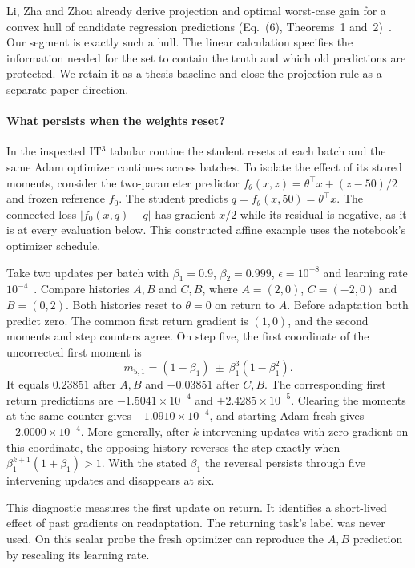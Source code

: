 \documentclass[11pt,a4paper]{article}
\begin{document}
Li, Zha and Zhou already derive projection and optimal worst-case gain for
a convex hull of candidate regression predictions (Eq.~(6), Theorems~1
and~2)~\cite{safer}. Our segment is exactly such a hull. The linear
calculation specifies the information needed for the set to contain the
truth and which old predictions are protected. We retain it as a thesis
baseline and close the projection rule as a separate paper direction.

\paragraph{What persists when the weights reset?}
In the inspected IT$^3$ tabular routine the student resets at each batch
and the same Adam optimizer continues across batches. To isolate the
effect of its stored moments, consider the two-parameter predictor
$f_\theta(x,z)=\theta^\top x+(z-50)/2$ and frozen reference $f_0$.
The student predicts $q=f_\theta(x,50)=\theta^\top x$. The connected
loss $|f_0(x,q)-q|$ has gradient $x/2$ while its residual is negative,
as it is at every evaluation below. This constructed affine example
uses the notebook's optimizer schedule.

Take two updates per batch with $\beta_1=0.9$, $\beta_2=0.999$,
$\epsilon=10^{-8}$ and learning rate $10^{-4}$~\cite{adam}.
Compare histories $A,B$ and $C,B$, where $A=(2,0)$, $C=(-2,0)$ and
$B=(0,2)$. Both histories reset to $\theta=0$ on return to $A$.
Before adaptation both predict zero. The common first return gradient
is $(1,0)$, and the second moments and step counters agree. On step five,
the first coordinate of the uncorrected first moment is
\[
 m_{5,1}=(1-\beta_1)\ \mathbin{\pm}\ \beta_1^3(1-\beta_1^2).
\]
It equals $0.23851$ after $A,B$ and $-0.03851$ after $C,B$.
The corresponding first return predictions are $-1.5041\times10^{-4}$
and $+2.4285\times10^{-5}$. Clearing the moments at the same counter
gives $-1.0910\times10^{-4}$, and starting Adam fresh gives
$-2.0000\times10^{-4}$. More generally, after $k$ intervening updates
with zero gradient on this coordinate, the opposing history reverses
the step exactly when $\beta_1^{k+1}(1+\beta_1)>1$. With the stated
$\beta_1$ the reversal persists through five intervening updates and
disappears at six.

This diagnostic measures the first update on return. It identifies a
short-lived effect of past gradients on readaptation. The returning
task's label was never used. On this scalar probe the fresh optimizer
can reproduce the $A,B$ prediction by rescaling its learning rate.
\end{document}
